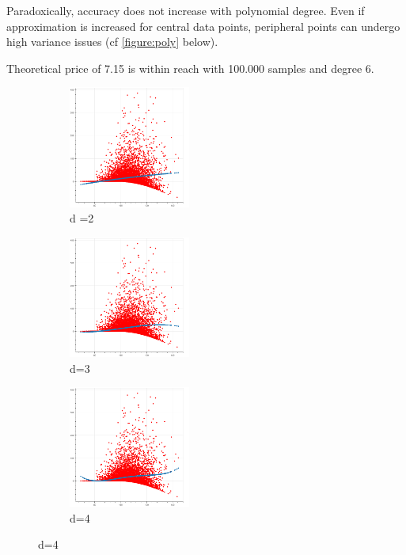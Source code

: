 \documentclass[english,11pt,openany]{report}
\theoremstyle{definition}
\theoremstyle{plain}
\theoremstyle{definition}
\begin{document}
Paradoxically, accuracy does not increase with polynomial degree. Even if approximation is increased for central data points, peripheral points can undergo high variance issues (cf \ref{figure:poly} below).

Theoretical price of 7.15 is within reach with 100.000 samples and degree 6. 

\begin{figure}[H]
	\centering
	\begin{subfigure}[t]{0.3\textwidth}
		\includegraphics[width=40mm]{lsm/l=2.png}
		\caption{d =2}
		\label{fig:a} %
	\end{subfigure}
	\begin{subfigure}[t]{0.3\textwidth}
		\includegraphics[width=40mm]{lsm/l=3.png}
		\caption{d=3}
		\label{fig:b}
	\end{subfigure}
	\begin{subfigure}[t]{0.3\textwidth}
		\includegraphics[width=40mm]{lsm/l=4.png}
		\caption{d=4}
		\label{fig:c}
	\end{subfigure}	
	

\end{figure}
\end{document}
